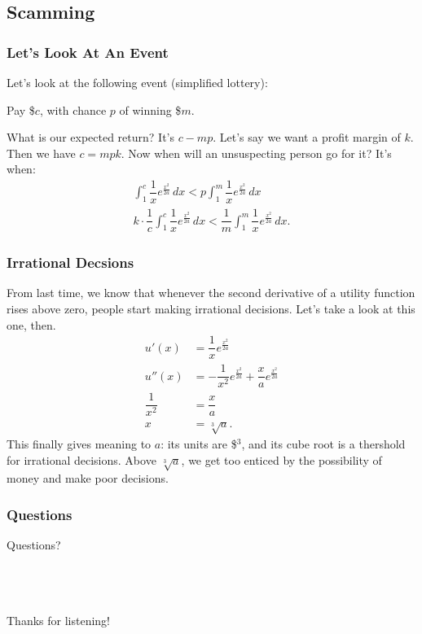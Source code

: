 \documentclass{beamer}
\begin{document}
    \subsection{Scamming}
        \begin{frame} \frametitle{Let's Look At An Event}
            Let's look at the following event (simplified lottery):\pause
            \begin{center}
                Pay \$$c$, with chance $p$ of winning \$$m$.
            \end{center}
            What is our expected return? It's $c - mp$. Let's say we want a profit margin of $k$. Then we have $c = mpk$. Now when will an unsuspecting person go for it? It's when: \pause
            \begin{align}
                \int_{1}^{c} \dfrac{1}{x} e^{\frac{x^2}{2a}} \, dx < p\int_{1}^{m} \dfrac{1}{x} e^{\frac{x^2}{2a}} \, dx \\
                k \cdot \dfrac{1}{c}\int_{1}^{c} \dfrac{1}{x} e^{\frac{x^2}{2a}} \, dx < \dfrac{1}{m}\int_{1}^{m} \dfrac{1}{x} e^{\frac{x^2}{2a}} \, dx.
            \end{align}
        \end{frame}
        \begin{frame} \frametitle{Irrational Decsions}
            From last time, we know that whenever the second derivative of a utility function rises above zero, people start making irrational decisions. Let's take a look at this one, then. \\ \pause
            \begin{align}
                u'(x) &= \dfrac{1}{x} e^{\frac{x^2}{2a}} \\
                u''(x)&= -\dfrac{1}{x^2}e^{\frac{x^2}{2a}} + \dfrac{x}{a}  e^{\frac{x^2}{2a}} \\
                \dfrac{1}{x^2} &= \dfrac{x}{a} \\
                x &= \sqrt[3]{a}.
            \end{align}
            This finally gives meaning to $a$: its units are \$$^3$, and its cube root is a thershold for irrational decisions. Above $\sqrt[3]{a}$, 
            we get too enticed by the possibility of money and make poor decisions.
        \end{frame}
        \begin{frame}\frametitle{Questions}
            Questions? \\~\\~\\~\\
        \end{frame}
        \begin{frame}
            \begin{center}
                Thanks for listening!
            \end{center}
        \end{frame}
\end{document}
